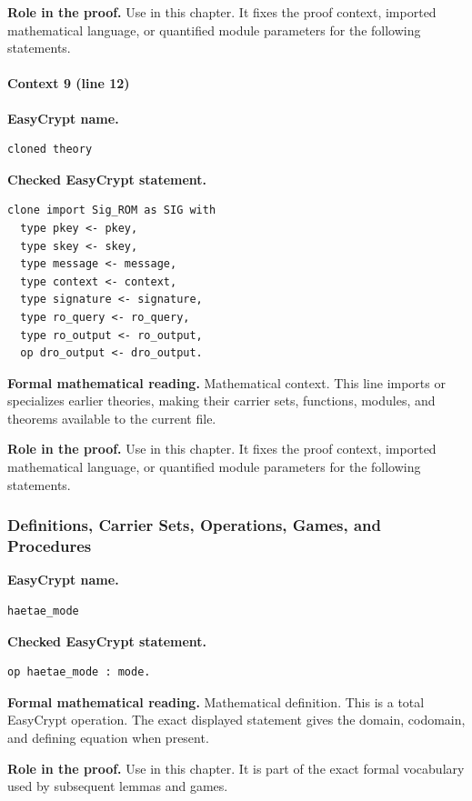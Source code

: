 \noindent\textbf{Role in the proof.}
Use in this chapter. It fixes the proof context, imported mathematical language, or quantified module parameters for the following statements.

\paragraph{Context 9 (line 12)}
\noindent\textbf{EasyCrypt name.}
\begin{lstlisting}[language=EasyCrypt,basicstyle=\ttfamily\scriptsize]
cloned theory
\end{lstlisting}
\noindent\textbf{Checked EasyCrypt statement.}
\begin{lstlisting}[language=EasyCrypt,basicstyle=\ttfamily\scriptsize]
clone import Sig_ROM as SIG with
  type pkey <- pkey,
  type skey <- skey,
  type message <- message,
  type context <- context,
  type signature <- signature,
  type ro_query <- ro_query,
  type ro_output <- ro_output,
  op dro_output <- dro_output.
\end{lstlisting}
\noindent\textbf{Formal mathematical reading.}
Mathematical context. This line imports or specializes earlier theories, making their carrier sets, functions, modules, and theorems available to the current file.

\noindent\textbf{Role in the proof.}
Use in this chapter. It fixes the proof context, imported mathematical language, or quantified module parameters for the following statements.

\subsubsection*{Definitions, Carrier Sets, Operations, Games, and Procedures}
\begin{formaldefinition}
\noindent\textbf{EasyCrypt name.}
\begin{lstlisting}[language=EasyCrypt,basicstyle=\ttfamily\scriptsize]
haetae_mode
\end{lstlisting}
\noindent\textbf{Checked EasyCrypt statement.}
\begin{lstlisting}[language=EasyCrypt,basicstyle=\ttfamily\scriptsize]
op haetae_mode : mode.
\end{lstlisting}
\noindent\textbf{Formal mathematical reading.}
Mathematical definition. This is a total EasyCrypt operation.  The exact displayed statement gives the domain, codomain, and defining equation when present.

\noindent\textbf{Role in the proof.}
Use in this chapter. It is part of the exact formal vocabulary used by subsequent lemmas and games.

\end{formaldefinition}

